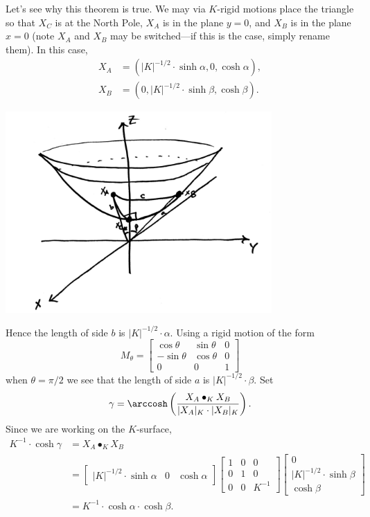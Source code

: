 \documentclass{ximera}
\begin{document}
Let's see why this theorem is true.  We may via $K$-rigid motions
place the triangle so that $X_C$ is at the North Pole, $X_A$ is in the
plane $y=0$, and $X_B$ is in the plane $x=0$ (note $X_A$ and $X_B$ may
be switched---if this is the case, simply rename them). In this case,
\begin{align*}
  X_A &= (|K|^{-1/2}\cdot \sinh\alpha, 0, \cosh\alpha),\\
  X_B &= (0, |K|^{-1/2}\cdot \sinh \beta, \cosh\beta).
\end{align*}
\begin{image}
  \includegraphics[width=4in]{hypPythag.png}
\end{image}
Hence the length of side $b$ is $|K|^{-1/2}\cdot\alpha$. Using a rigid motion of the form
\[
M_\theta=
\begin{bmatrix}
  \cos\theta & \sin\theta & 0\\
  -\sin\theta & \cos\theta & 0\\
  0 & 0 & 1
\end{bmatrix}
\]
when $\theta = \pi/2$ we see that the length of side $a$ is $|K|^{-1/2}\cdot
\beta$. Set
\[
\gamma = \arccosh\left(\frac{X_A\bullet_K X_B}{|X_A|_K\cdot |X_B|_K}\right).
\]
Since we are working on the $K$-surface,
\begin{align*}
  K^{-1}\cdot \cosh \gamma &= X_A\bullet_K X_B\\
  &=
  \begin{bmatrix}
    |K|^{-1/2}\cdot \sinh\alpha &  0 & \cosh\alpha
  \end{bmatrix}
    \begin{bmatrix}
      1 & 0 & 0\\
      0 & 1 & 0\\
      0 & 0 & K^{-1}
    \end{bmatrix}
    \begin{bmatrix}
      0\\
      |K|^{-1/2}\cdot\sinh\beta\\
      \cosh\beta
    \end{bmatrix}\\
   &=K^{-1} \cdot \cosh\alpha \cdot \cosh\beta.
  \end{align*}
\end{document}
